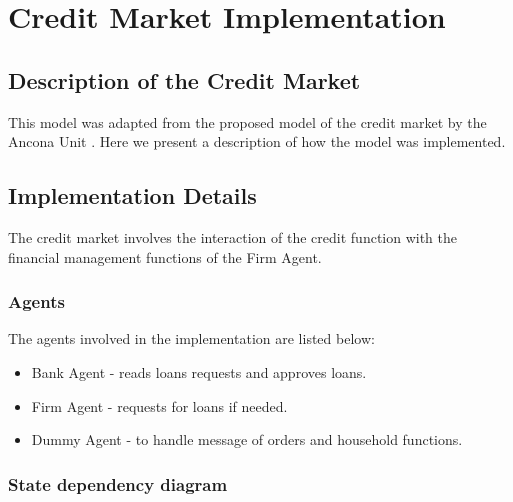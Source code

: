 \chapter{Credit Market Implementation}

\section{Description of the Credit Market}
This model was adapted from the proposed model of the credit market
by the Ancona Unit \cite{?}. Here we present a description of how the
model was implemented.

\section{Implementation Details}
The credit market involves the interaction of the credit function
with the financial management functions of the Firm Agent.

\subsection{Agents}
The agents involved in the implementation are listed below:
\begin{itemize}
\item Bank Agent - reads loans requests and approves loans.
\item Firm Agent - requests for loans if needed.
\item Dummy Agent - to handle message of orders and household
functions.
\end{itemize}

\subsection{State dependency diagram}

